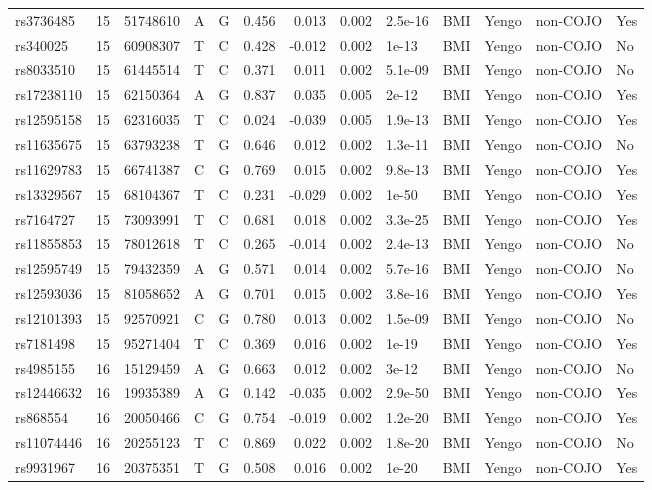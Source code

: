 \documentclass[11pt,twoside]{bristolthesis}
\begin{document}
\begin{longtable}[t]{lrlllrrrlllll}
rs3736485 & 15 & 51748610 & A & G & 0.456 & 0.013 & 0.002 & 2.5e-16 & BMI & Yengo & non-COJO & Yes\\
\addlinespace
rs340025 & 15 & 60908307 & T & C & 0.428 & -0.012 & 0.002 & 1e-13 & BMI & Yengo & non-COJO & No\\
rs8033510 & 15 & 61445514 & T & C & 0.371 & 0.011 & 0.002 & 5.1e-09 & BMI & Yengo & non-COJO & No\\
rs17238110 & 15 & 62150364 & A & G & 0.837 & 0.035 & 0.005 & 2e-12 & BMI & Yengo & non-COJO & Yes\\
rs12595158 & 15 & 62316035 & T & C & 0.024 & -0.039 & 0.005 & 1.9e-13 & BMI & Yengo & non-COJO & Yes\\
rs11635675 & 15 & 63793238 & T & G & 0.646 & 0.012 & 0.002 & 1.3e-11 & BMI & Yengo & non-COJO & No\\
\addlinespace
rs11629783 & 15 & 66741387 & C & G & 0.769 & 0.015 & 0.002 & 9.8e-13 & BMI & Yengo & non-COJO & Yes\\
rs13329567 & 15 & 68104367 & T & C & 0.231 & -0.029 & 0.002 & 1e-50 & BMI & Yengo & non-COJO & Yes\\
rs7164727 & 15 & 73093991 & T & C & 0.681 & 0.018 & 0.002 & 3.3e-25 & BMI & Yengo & non-COJO & Yes\\
rs11855853 & 15 & 78012618 & T & C & 0.265 & -0.014 & 0.002 & 2.4e-13 & BMI & Yengo & non-COJO & No\\
rs12595749 & 15 & 79432359 & A & G & 0.571 & 0.014 & 0.002 & 5.7e-16 & BMI & Yengo & non-COJO & No\\
\addlinespace
rs12593036 & 15 & 81058652 & A & G & 0.701 & 0.015 & 0.002 & 3.8e-16 & BMI & Yengo & non-COJO & Yes\\
rs12101393 & 15 & 92570921 & C & G & 0.780 & 0.013 & 0.002 & 1.5e-09 & BMI & Yengo & non-COJO & No\\
rs7181498 & 15 & 95271404 & T & C & 0.369 & 0.016 & 0.002 & 1e-19 & BMI & Yengo & non-COJO & Yes\\
rs4985155 & 16 & 15129459 & A & G & 0.663 & 0.012 & 0.002 & 3e-12 & BMI & Yengo & non-COJO & No\\
rs12446632 & 16 & 19935389 & A & G & 0.142 & -0.035 & 0.002 & 2.9e-50 & BMI & Yengo & non-COJO & Yes\\
\addlinespace
rs868554 & 16 & 20050466 & C & G & 0.754 & -0.019 & 0.002 & 1.2e-20 & BMI & Yengo & non-COJO & Yes\\
rs11074446 & 16 & 20255123 & T & C & 0.869 & 0.022 & 0.002 & 1.8e-20 & BMI & Yengo & non-COJO & No\\
rs9931967 & 16 & 20375351 & T & G & 0.508 & 0.016 & 0.002 & 1e-20 & BMI & Yengo & non-COJO & Yes\\

\end{longtable}
\end{document}
